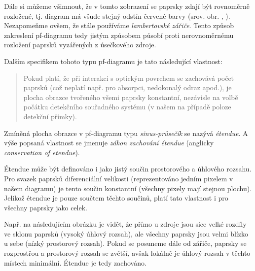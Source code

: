 
Dále si můžeme všimnout, že v tomto zobrazení se paprsky zdají být rovnoměrně rozložené, tj. diagram má všude stejný odstín červené barvy (srov. obr. , ). Nezapomeňme ovšem, že stále používáme \emph{lambertovské zářiče}. Tento způsob zakreslení pf-diagramu tedy jistým způsobem působí proti nerovnoměrnému rozložení paprsků vyzářených z úsečkového zdroje.

Dalším specifikem tohoto typu pf-diagramu je tato následující vlastnost:

\begin{quote}
    Pokud platí, že při interakci s optickým povrchem se zachovává počet paprsků (což neplatí např. pro absorpci, nedokonalý odraz apod.), je plocha obrazce tvořeného všemi paprsky konstantní, nezávisle na volbě počátku detekčního souřadného systému (v našem na případě poloze detekční přímky).
\end{quote}

Zmíněná plocha obrazce v pf-diagramu typu \emph{sinus-průsečík} se nazývá \emph{étendue}. A výše popsaná vlastnost se jmenuje \emph{zákon zachování étendue} (anglicky \emph{conservation of etendue}).

Étendue může být definováno i jako jistý součin prostorového a úhlového rozsahu. Pro svazek paprsků diferenciální velikosti (reprezentováno jedním pixelem v našem diagramu) je tento součin konstantní (všechny pixely mají stejnou plochu). Jelikož étendue je pouze součtem těchto součinů, platí tato vlastnost i pro všechny paprsky jako celek.

Např. na následujícím obrázku je vidět, že přímo u zdroje jsou sice velké rozdíly ve sklonu paprsků (vysoký úhlový rozsah), ale všechny paprsky jsou velmi blízko u sebe (nízký prostorový rozsah). Pokud se posuneme dále od zářiče, paprsky se rozprostřou a prostorový rozsah se zvětší, avšak lokálně je úhlový rozsah v těchto místech minimální. Étendue je tedy zachováno.


